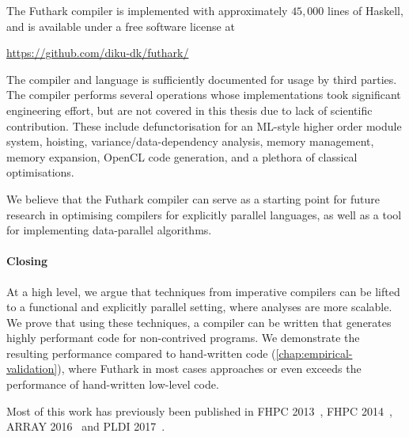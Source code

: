 The Futhark compiler is implemented with approximately $45,000$ lines
of Haskell, and is available under a free software license at

\centerline{\url{https://github.com/diku-dk/futhark/}}

The compiler and language is sufficiently documented for usage by
third parties.  The compiler performs several operations whose
implementations took significant engineering effort, but are not
covered in this thesis due to lack of scientific contribution.  These
include defunctorisation for an ML-style higher order module system,
hoisting, variance/data-dependency analysis, memory management, memory
expansion, OpenCL code generation, and a plethora of classical
optimisations.

We believe that the Futhark compiler can serve as a starting point for
future research in optimising compilers for explicitly parallel
languages, as well as a tool for implementing data-parallel
algorithms.

\paragraph{Closing}

At a high level, we argue that techniques from imperative compilers
can be lifted to a functional and explicitly parallel setting, where
analyses are more scalable.  We prove that using these techniques, a
compiler can be written that generates highly performant code for
non-contrived programs.  We demonstrate the resulting performance
compared to hand-written code (\cref{chap:empirical-validation}),
where Futhark in most cases approaches or even exceeds the performance
of hand-written low-level code.

Most of this work has previously been published in FHPC
2013~\cite{henriksen2013t2}, FHPC 2014~\cite{henriksen2014size}, ARRAY
2016~\cite{Futhark:redomap,} and PLDI
2017~\cite{henriksen2017futhark}.

